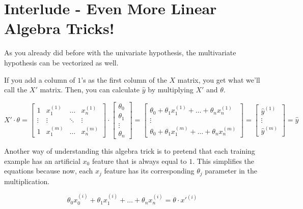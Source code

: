 
\section*{Interlude - Even More Linear Algebra Tricks!}

As you already did before with the univariate hypothesis,
the multivariate hypothesis can be vectorized as well.  

If you add a column of $1$'s as the first column of the $X$ matrix, you get what we'll call the $X'$ matrix.  
Then, you can calculate $\hat{y}$ by multiplying $X'$ and $\theta$.

$$
X' \cdot \theta = 
\begin{bmatrix} 
1 & x_{1}^{(1)} & \dots & x_{n}^{(1)}\\
\vdots & \vdots & \ddots & \vdots\\
1 & x_{1}^{(m)} & \dots &  x_{n}^{(m)}\end{bmatrix}
\cdot
\begin{bmatrix}
\theta_0 \\ 
\theta_1 \\
\vdots \\
\theta_n
\end{bmatrix} 
= 
\begin{bmatrix} 
\theta_0 + \theta_{1} x_{1}^{(1)} + \dots + \theta_{n} x_{n}^{(1)}\\ 
\vdots \\ 
\theta_0 + \theta_{1} x_{1}^{(m)} + \dots + \theta_{n} x_{n}^{(m)}
\end{bmatrix}
=
\begin{bmatrix}
\hat{y}^{(1)} \\ 
\vdots \\
\hat{y}^{(m)}
\end{bmatrix} 
=
\hat{y}
$$

Another way of understanding this algebra trick is to pretend that each training
example has an artificial $x_0$ feature that is always equal to $1$.
This simplifies the equations because now, each $x_j$ feature has its
corresponding $\theta_j$ parameter in the multiplication.

$$
\theta_0x_0^{(i)} + \theta_{1} x_{1}^{(i)} + \dots + \theta_{n} x_{n}^{(i)} = \theta \cdot x'^{(i)}
$$